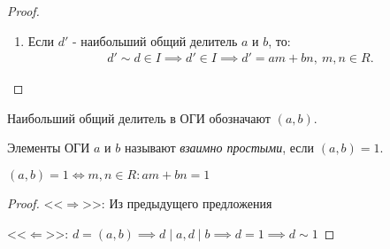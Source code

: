 \begin{proof}
\begin{enumerate}
        \item Если $d'$ - наибольший общий делитель $a$ и $b$, то:
        \begin{gather*}
            d' \sim d \in I \implies d' \in I \implies d' = am + bn,~m, n \in R.
        \end{gather*}
    \end{enumerate}
\end{proof}

\begin{notice}
    Наибольший общий делитель в ОГИ обозначают $(a, b)$.
\end{notice}

\begin{defn}
    Элементы  ОГИ $a$ и $b$ называют \emph{взаимно простыми}, если $(a, b) = 1$.
\end{defn}

\begin{theorem-non}
    $(a, b) = 1 \iff m, n \in R: am + bn = 1$
\end{theorem-non}

\begin{proof}
    <<$\Longrightarrow$>>: Из предыдущего предложения

    <<$\Longleftarrow$>>: $d = (a, b) \implies d \mid a, d \mid b \implies d = 1 \implies d \sim 1$
\end{proof}
